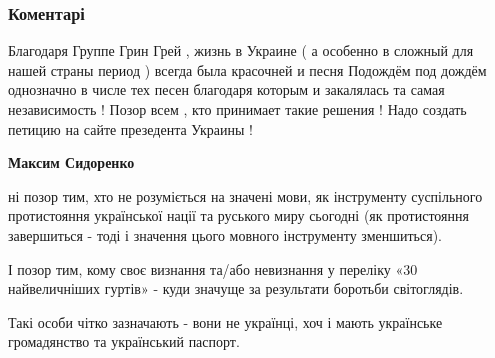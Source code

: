  
 
 
 
 
\subsubsection{Коментарі}

\begin{itemize}
 

Благодаря Группе Грин Грей , жизнь в Украине ( а особенно в сложный для нашей
страны период ) всегда была красочней и песня Подождём под дождём однозначно в
числе тех песен благодаря которым и закалялась та самая независимость ! Позор
всем , кто принимает такие решения ! Надо создать петицию на сайте презедента
Украины !

\begin{itemize}
 
\textbf{Максим Сидоренко} 

ні позор тим, хто не розуміється на значені мови, як інструменту суспільного
протистояння української нації та руського миру сьогодні (як протистояння
завершиться - тоді і значення цього мовного інструменту зменшиться).

І позор тим, кому своє визнання та/або невизнання у переліку «30 найвеличніших
гуртів» - куди значуще за результати боротьби світоглядів.

Такі особи чітко зазначають - вони не українці, хоч і мають українське
громадянство та український паспорт.

\begin{itemize}
 

\end{itemize}
\end{itemize}
\end{itemize}
